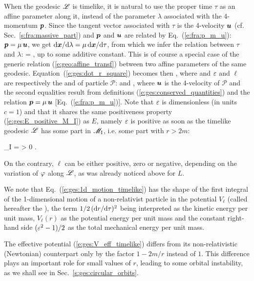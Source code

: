 When the geodesic $\mathscr{L}$ is timelike, it is natural to use the proper time $\tau$
as an affine parameter along it, instead of the parameter $\lambda$ associated
with the 4-momentum $\bm{p}$. Since the tangent vector associated with $\tau$
is the 4-velocity $\bm{u}$ (cf. Sec.~\ref{s:fra:massive_part}) and $\bm{p}$ and $\bm{u}$ are related by
Eq.~(\ref{e:fra:p_m_u}): $\bm{p} = \mu \, \bm{u}$, we get
$\mathrm{d}\bm{x}/\mathrm{d}\lambda = \mu \, \mathrm{d}\bm{x}/\mathrm{d}\tau$, from which we infer the relation
between $\tau$ and $\lambda$:
\be
    \tau = \mu \lambda ,
\ee
up to some additive constant. This is
of course a special case of the generic relation (\ref{e:geo:affine_transf})
between two affine parameters of the same geodesic.
Equation~(\ref{e:ges:dot_r_square}) becomes then
\be \label{e:ges:1d_motion_timelike}
     ,
\ee
where
\be \label{e:ges:V_eff_timelike}
\ee
and $\varepsilon$ and $\ell$ are respectively the
and 
of particle $\mathscr{P}$:
\be \label{e:ges:def_eps_ell}
  \qquad\mbox{and}\qquad
   ,
\ee
where $\bm{u}$ is the 4-velocity of $\mathscr{P}$ and the second equalities
result from definitions (\ref{e:ges:conserved_quantities})
and the relation $\bm{p} = \mu \, \bm{u}$ [Eq.~(\ref{e:fra:p_m_u})].
Note that $\varepsilon$ is dimensionless (in units $c=1$) and that it shares the
same positiveness property (\ref{e:ges:E_positive_M_I}) as $E$,
namely $\varepsilon$ is positive as soon as the timelike geodesic $\mathscr{L}$ has some part
in $\mathscr{M}_{\rm I}$, i.e. some part with $r>2m$:
\begin{greybox}
\be \label{e:ges:eps_positive_M_I}
    \Li \cap \M_{\rm I} \not= \varnothing \quad \Longrightarrow \quad \veps > 0 .
\ee
\end{greybox}
On the contrary, $\ell$ can be either positive, zero or negative, depending
on the variation of $\varphi$ along $\mathscr{L}$, as was already noticed above for $L$.

We note that Eq.~(\ref{e:ges:1d_motion_timelike}) has the shape of the
first integral of the
1-dimensional motion of a non-relativist particle in the potential
$V_{\ell}$ (called hereafter the ), the term $1/2 \, (\mathrm{d} r/\mathrm{d}\tau)^2$ being interpreted as
the kinetic energy per unit mass, $V_{\ell}(r)$ as the potential
energy per unit mass and the constant right-hand side $(\varepsilon^2-1)/2$ as the total
mechanical energy per unit mass.
\begin{remark} \label{r:ges:V_eff_Newt}
The effective potential (\ref{e:ges:V_eff_timelike}) differs from its
non-relativistic (Newtonian) counterpart only by the factor $1-2m/r$ instead of
$1$. This difference plays an important role for small values of $r$,
leading to some orbital instability, as we shall see in Sec.~\ref{s:ges:circular_orbits}.
\end{remark}

